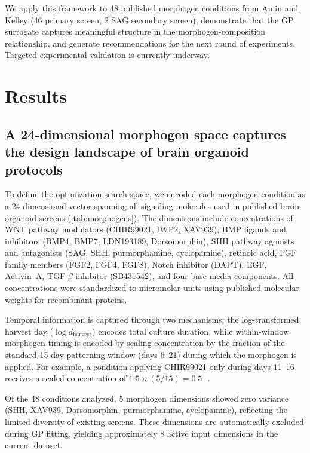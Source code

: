 \documentclass[times,twoside]{zHenriquesLab-StyleBioRxiv}
\begin{document}
We apply this framework to 48 published morphogen conditions from Amin and Kelley \cite{Amin2024} (46 primary screen, 2 SAG secondary screen), demonstrate that the GP surrogate captures meaningful structure in the morphogen-composition relationship, and generate recommendations for the next round of experiments. Targeted experimental validation is currently underway.

\section*{Results}

\subsection*{A 24-dimensional morphogen space captures the design landscape of brain organoid protocols}

To define the optimization search space, we encoded each morphogen condition as a 24-dimensional vector spanning all signaling molecules used in published brain organoid screens (\cref{tab:morphogens}). The dimensions include concentrations of WNT pathway modulators (CHIR99021, IWP2, XAV939), BMP ligands and inhibitors (BMP4, BMP7, LDN193189, Dorsomorphin), SHH pathway agonists and antagonists (SAG, SHH, purmorphamine, cyclopamine), retinoic acid, FGF family members (FGF2, FGF4, FGF8), Notch inhibitor (DAPT), EGF, Activin~A, TGF-$\beta$ inhibitor (SB431542), and four base media components. All concentrations were standardized to micromolar units using published molecular weights for recombinant proteins.

Temporal information is captured through two mechanisms: the log-transformed harvest day ($\log d_\text{harvest}$) encodes total culture duration, while within-window morphogen timing is encoded by scaling concentration by the fraction of the standard 15-day patterning window (days 6--21) during which the morphogen is applied. For example, a condition applying CHIR99021 only during days 11--16 receives a scaled concentration of $1.5 \times (5/15) = 0.5$\,\si{\micro\Molar}.

Of the 48 conditions analyzed, 5 morphogen dimensions showed zero variance (SHH, XAV939, Dorsomorphin, purmorphamine, cyclopamine), reflecting the limited diversity of existing screens. These dimensions are automatically excluded during GP fitting, yielding approximately 8 active input dimensions in the current dataset.
\end{document}
